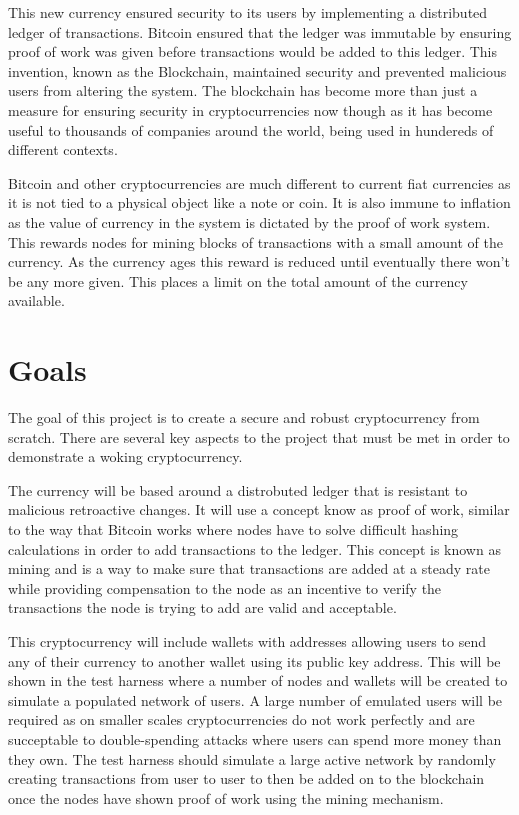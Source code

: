 \documentclass{l4proj}
\begin{document}
This new currency ensured security to its users by implementing a distributed ledger of transactions. Bitcoin
ensured that the ledger was immutable by ensuring proof of work was given before transactions would be
added to this ledger. This invention, known as the Blockchain, maintained security and prevented malicious
users from altering the system. The blockchain has become more than just a measure for ensuring security
in cryptocurrencies now though as it has become useful to thousands of companies around the world, being used
in hundereds of different contexts.

Bitcoin and other cryptocurrencies are much different to current fiat currencies as it is not tied to a physical
object like a note or coin. It is also immune to inflation as the value of currency in the system is dictated
by the proof of work system. This rewards nodes for mining blocks of transactions with a small amount of the 
currency. As the currency ages this reward is reduced until eventually there won't be any more given. This places
a limit on the total amount of the currency available.

\section{Goals}
The goal of this project is to create a secure and robust cryptocurrency from scratch. There are several key aspects
to the project that must be met in order to demonstrate a woking cryptocurrency.

The currency will be based around
a distrobuted ledger that is resistant to malicious retroactive changes. It will use a concept know as proof of work,
similar to the way that Bitcoin works where nodes have to solve difficult hashing calculations in order
to add transactions to the ledger. This concept is known as mining and is a way to make sure that transactions
are added at a steady rate while providing compensation to the node as an incentive to verify the transactions the node
is trying to add are valid and acceptable.

This cryptocurrency will include wallets with addresses allowing users to send any of their currency to another
wallet using its public key address. This will be shown in the test harness where a number of nodes and wallets 
will be created to simulate a populated network of users. A large number of emulated users will be required as on
smaller scales cryptocurrencies do not work perfectly and are succeptable to double-spending attacks where users
can spend more money than they own. The test harness should simulate a large active network by randomly creating
transactions from user to user to then be added on to the blockchain once the nodes have shown proof of work using 
the mining mechanism.
\end{document}
